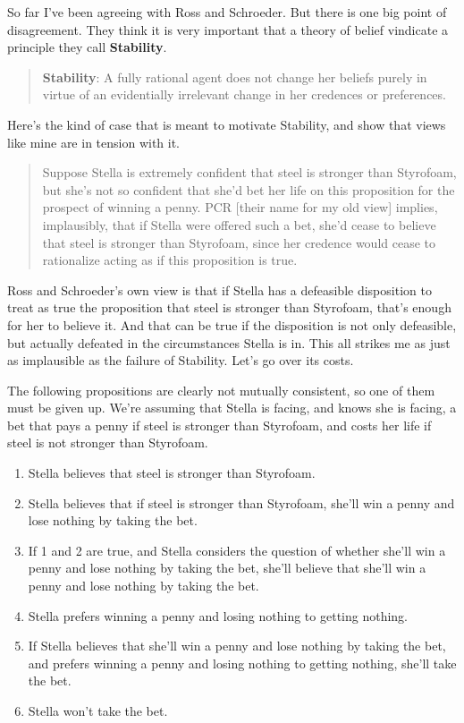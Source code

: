 \documentclass[11pt,]{book}
\providecommand{\tightlist}{%
  \setlength{\itemsep}{0pt}\setlength{\parskip}{0pt}}
\begin{document}
So far I've been agreeing with Ross and Schroeder. But there is one big point of disagreement. They think it is very important that a theory of belief vindicate a principle they call \textbf{Stability}.

\begin{quote}
\textbf{Stability}: A fully rational agent does not change her beliefs purely in virtue of an evidentially irrelevant change in her credences or preferences. \citeyearpar[20]{RossSchroeder2014}
\end{quote}

Here's the kind of case that is meant to motivate Stability, and show that views like mine are in tension with it.

\begin{quote}
Suppose Stella is extremely confident that steel is stronger than Styrofoam, but she's not so confident that she'd bet her life on this proposition for the prospect of winning a penny. PCR {[}their name for my old view{]} implies, implausibly, that if Stella were offered such a bet, she'd cease to believe that steel is stronger than Styrofoam, since her credence would cease to rationalize acting as if this proposition is true. \citeyearpar[20]{RossSchroeder2014}
\end{quote}

Ross and Schroeder's own view is that if Stella has a defeasible disposition to treat as true the proposition that steel is stronger than Styrofoam, that's enough for her to believe it. And that can be true if the disposition is not only defeasible, but actually defeated in the circumstances Stella is in. This all strikes me as just as implausible as the failure of Stability. Let's go over its costs.

The following propositions are clearly not mutually consistent, so one of them must be given up. We're assuming that Stella is facing, and knows she is facing, a bet that pays a penny if steel is stronger than Styrofoam, and costs her life if steel is not stronger than Styrofoam.

\begin{enumerate}
\def\labelenumi{\arabic{enumi}.}
\tightlist
\item
  Stella believes that steel is stronger than Styrofoam.
\item
  Stella believes that if steel is stronger than Styrofoam, she'll win a penny and lose nothing by taking the bet.
\item
  If 1 and 2 are true, and Stella considers the question of whether she'll win a penny and lose nothing by taking the bet, she'll believe that she'll win a penny and lose nothing by taking the bet.
\item
  Stella prefers winning a penny and losing nothing to getting nothing.
\item
  If Stella believes that she'll win a penny and lose nothing by taking the bet, and prefers winning a penny and losing nothing to getting nothing, she'll take the bet.
\item
  Stella won't take the bet.
\end{enumerate}
\end{document}
